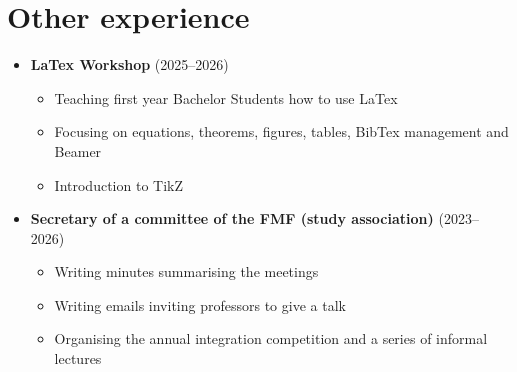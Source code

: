 \section*{Other experience}
\begin{itemize}
    \item \textbf{LaTex Workshop} (2025--2026)\begin{itemize}
        \item Teaching first year Bachelor Students how to use LaTex 
        \item Focusing on equations, theorems, figures, tables, BibTex
        management and Beamer 
        \item Introduction to TikZ
    \end{itemize}
    \item \textbf{Secretary of a committee of the FMF (study association)} (2023--2026)\begin{itemize}
    \item Writing minutes summarising the meetings 
    \item Writing emails inviting professors to give a talk 
    \item Organising the annual integration competition and a series of informal lectures
\end{itemize}
\end{itemize}